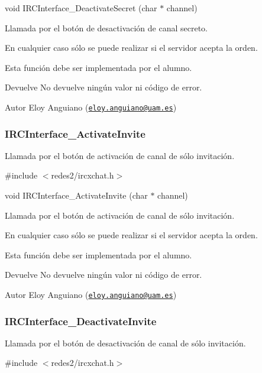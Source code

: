 void I\-R\-C\-Interface\-\_\-\-Deactivate\-Secret (char $\ast$ channel)

Llamada por el botón de desactivación de canal secreto.

En cualquier caso sólo se puede realizar si el servidor acepta la orden.

Esta función debe ser implementada por el alumno.

\begin{DoxyReturn}{Devuelve}
No devuelve ningún valor ni código de error.
\end{DoxyReturn}
\begin{DoxyAuthor}{Autor}
Eloy Anguiano (\href{mailto:eloy.anguiano@uam.es}{\tt eloy.\-anguiano@uam.\-es})
\end{DoxyAuthor}


 \hypertarget{IRCInterface_ActivateInvite}{}\subsubsection{I\-R\-C\-Interface\-\_\-\-Activate\-Invite}\label{IRCInterface_ActivateInvite}
Llamada por el botón de activación de canal de sólo invitación.

\#include $<$redes2/ircxchat.\-h$>$

void I\-R\-C\-Interface\-\_\-\-Activate\-Invite (char $\ast$ channel)

Llamada por el botón de activación de canal de sólo invitación.

En cualquier caso sólo se puede realizar si el servidor acepta la orden.

Esta función debe ser implementada por el alumno.

\begin{DoxyReturn}{Devuelve}
No devuelve ningún valor ni código de error.
\end{DoxyReturn}
\begin{DoxyAuthor}{Autor}
Eloy Anguiano (\href{mailto:eloy.anguiano@uam.es}{\tt eloy.\-anguiano@uam.\-es})
\end{DoxyAuthor}


 \hypertarget{IRCInterface_DeactivateInvite}{}\subsubsection{I\-R\-C\-Interface\-\_\-\-Deactivate\-Invite}\label{IRCInterface_DeactivateInvite}
Llamada por el botón de desactivación de canal de sólo invitación.

\#include $<$redes2/ircxchat.\-h$>$

